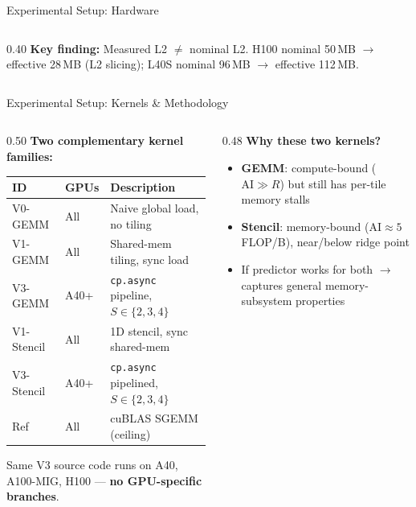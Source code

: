 \documentclass[aspectratio=169,10pt]{beamer}
\begin{document}
\begin{frame}{Experimental Setup: Hardware}
\begin{columns}[T]
\begin{column}{0.40\textwidth}
\vspace{0.3em}
\scriptsize
\textbf{Key finding:} Measured L2 $\neq$ nominal L2. H100 nominal 50\,MB $\to$ effective 28\,MB (L2 slicing); L40S nominal 96\,MB $\to$ effective 112\,MB.
\end{column}
\end{columns}
\end{frame}

\begin{frame}{Experimental Setup: Kernels \& Methodology}

\begin{columns}[T]
\begin{column}{0.50\textwidth}
\textbf{Two complementary kernel families:}

\vspace{0.3em}
\renewcommand{\arraystretch}{1.2}
\begin{table}
\centering
\scriptsize
\begin{tabular}{@{}llp{3.5cm}@{}}
\toprule
\textbf{ID} & \textbf{GPUs} & \textbf{Description} \\
\midrule
V0-GEMM & All & Naive global load, no tiling \\
V1-GEMM & All & Shared-mem tiling, sync load \\
V3-GEMM & A40+ & \texttt{cp.async} pipeline, $S \in \{2,3,4\}$ \\
\midrule
V1-Stencil & All & 1D stencil, sync shared-mem \\
V3-Stencil & A40+ & \texttt{cp.async} pipelined, $S \in \{2,3,4\}$ \\
\midrule
Ref & All & cuBLAS SGEMM (ceiling) \\
\bottomrule
\end{tabular}
\end{table}

\vspace{0.3em}
\scriptsize
Same V3 source code runs on A40, A100-MIG, H100 --- \textbf{no GPU-specific branches}.
\end{column}

\begin{column}{0.48\textwidth}
\textbf{Why these two kernels?}
\begin{itemize}\scriptsize
    \item \textbf{GEMM}: compute-bound ($\text{AI} \gg R$) but still has per-tile memory stalls
    \item \textbf{Stencil}: memory-bound ($\text{AI} \approx 5$ FLOP/B), near/below ridge point
    \item If predictor works for both $\to$ captures general memory-subsystem properties
\end{itemize}


\end{column}
\end{columns}
\end{frame}
\end{document}
